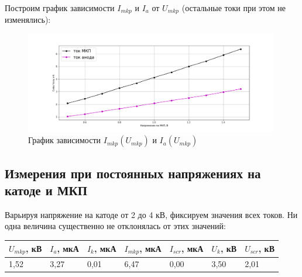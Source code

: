 Построим график зависимости $I_{{mkp}}$ и $I_{a}$ от $U_{mkp}$ (остальные токи при этом не изменялись):

\begin{figure}[h]
    \centering
    \includegraphics[width=0.99\textwidth]{2 pic.png}
    \caption{График зависимости $I_{{mkp}}(U_{mkp})$ и $I_{a}(U_{mkp})$}
\end{figure}

\subsection* {Измерения при постоянных напряжениях на катоде и МКП}

Варьируя напряжение на катоде от 2 до 4 кВ, фиксируем значения всех токов. Ни одна величина существенно не отклонялась от этих значений:

\begin{table}[h]
\centering
\begin{tabular}{|l|l|l|l|l|l|l|}
\hline
$U_{mkp}$,   кВ & $I_a$, мкА & $I_k$, мкА & $I_{mkp}$, мкА & $I_{scr}$, мкА & $U_k$, кВ & $U_{scr}$, кВ \\ \hline
1,52            & 3,27       & 0,01       & 6,47           & 0,00           & 3,50      & 2,01          \\ \hline
\end{tabular}
\end{table}

